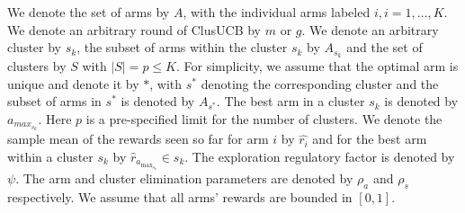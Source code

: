 We denote the set of arms by $A$, with the individual arms labeled $i, i=1,\ldots,K$.
We denote an arbitrary round of ClusUCB by $m$ or $g$. We denote an arbitrary cluster by $s_{k}$, the subset of arms within the cluster $s_k$ by  $A_{s_{k}}$ and the set of clusters by $S$ with $|S|=p\leq K$. For simplicity, we assume that the optimal arm is unique and denote it by ${*}$, with $s^{*}$ denoting the corresponding cluster and the subset of arms in $s^{*}$ is denoted by $A_{s^{*}}$. The best arm in a cluster $s_{k}$ is denoted by $a_{max_{s_{k}}}$. Here $p$ is a pre-specified limit for the number of clusters. 
We denote the sample mean of the rewards seen so far for arm $i$ by $\hat{r_i}$ and for the best arm within a cluster $s_k$ by $\hat{r}_{a_{\max_{s_{k}}}}\in s_{k}$. The exploration regulatory factor is denoted by $\psi$. The arm and cluster elimination parameters are denoted by $\rho_{a}$ and $\rho_{s}$ respectively. 
We assume that all arms' rewards are bounded in $[0,1]$.


